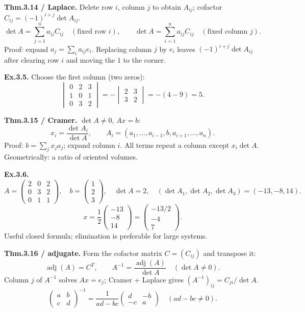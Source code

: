 \documentclass[11pt,letterpaper]{article}
\begin{document}
\textbf{Thm.3.14 / Laplace.} Delete row \(i\), column \(j\) to obtain
\(A_{ij}\); cofactor \(C_{ij}=(-1)^{i+j}\det A_{ij}\). \[
\det A=\sum_{j=1}^n a_{ij}C_{ij}\quad(\text{fixed row }i),\qquad
\det A=\sum_{i=1}^n a_{ij}C_{ij}\quad(\text{fixed column }j).
\] Proof: expand \(a_j=\sum_i a_{ij}e_i\). Replacing column \(j\) by
\(e_i\) leaves \((-1)^{i+j}\det A_{ij}\) after clearing row \(i\) and
moving the \(1\) to the corner.

\textbf{Ex.3.5.} Choose the first column (two zeros): \[
\begin{vmatrix}0&2&3\\1&0&1\\0&3&2\end{vmatrix}
=-\begin{vmatrix}2&3\\3&2\end{vmatrix}=-(4-9)=5.
\]

\textbf{Thm.3.15 / Cramer.} \(\det A\ne0\), \(Ax=b\): \[
x_i=\frac{\det A_i}{\det A},\qquad
A_i=(a_1,\ldots,a_{i-1},b,a_{i+1},\ldots,a_n).
\] Proof: \(b=\sum_jx_ja_j\); expand column \(i\). All terms repeat a
column except \(x_i\det A\). Geometrically: a ratio of oriented volumes.

\textbf{Ex.3.6.} \[
A=\begin{pmatrix}2&0&2\\0&3&2\\0&1&1\end{pmatrix},\quad
b=\begin{pmatrix}1\\2\\3\end{pmatrix},\quad
\det A=2,\quad(\det A_1,\det A_2,\det A_3)=(-13,-8,14).
\] \[
x=\frac12\begin{pmatrix}-13\\-8\\14\end{pmatrix}
=\begin{pmatrix}-13/2\\-4\\7\end{pmatrix}.
\] Useful closed formula; elimination is preferable for large systems.

\textbf{Thm.3.16 / adjugate.} Form the cofactor matrix \(C=(C_{ij})\)
and transpose it: \[
\operatorname{adj}(A)=C^T,\qquad
A^{-1}=\frac{\operatorname{adj}(A)}{\det A}\quad(\det A\ne0).
\] Column \(j\) of \(A^{-1}\) solves \(Ax=e_j\); Cramer + Laplace gives
\((A^{-1})_{ij}=C_{ji}/\det A\). \[
\begin{pmatrix}a&b\\c&d\end{pmatrix}^{-1}
=\frac1{ad-bc}\begin{pmatrix}d&-b\\-c&a\end{pmatrix}\quad(ad-bc\ne0).
\]
\end{document}
